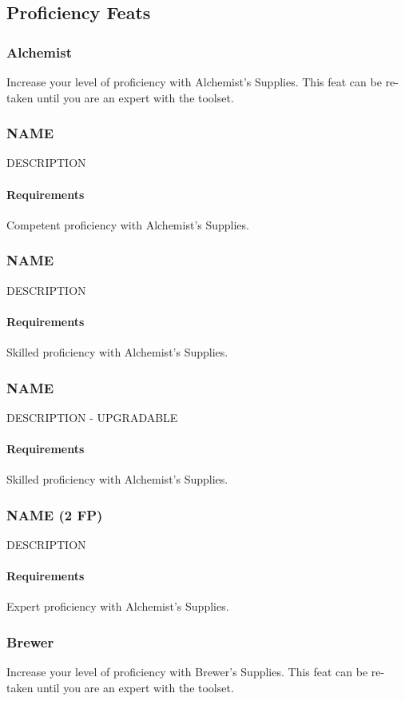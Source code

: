 \subsection*{Proficiency Feats}
\subsubsection{Alchemist} \label{feat::alchemist}
    Increase your level of proficiency with Alchemist's Supplies.
    This feat can be re-taken until you are an expert with the toolset.
\subsubsection{NAME} \label{feat::name}
    DESCRIPTION
    \paragraph{Requirements} Competent proficiency with Alchemist's Supplies.
\subsubsection{NAME} \label{feat::name}
    DESCRIPTION
    \paragraph{Requirements} Skilled proficiency with Alchemist's Supplies.
\subsubsection{NAME} \label{feat::name}
    DESCRIPTION - UPGRADABLE
    \paragraph{Requirements} Skilled proficiency with Alchemist's Supplies.
\subsubsection{NAME (2 FP)} \label{feat::name}
    DESCRIPTION
    \paragraph{Requirements} Expert proficiency with Alchemist's Supplies.
\subsubsection{Brewer} \label{feat::brewer}
    Increase your level of proficiency with Brewer's Supplies.
    This feat can be re-taken until you are an expert with the toolset.
